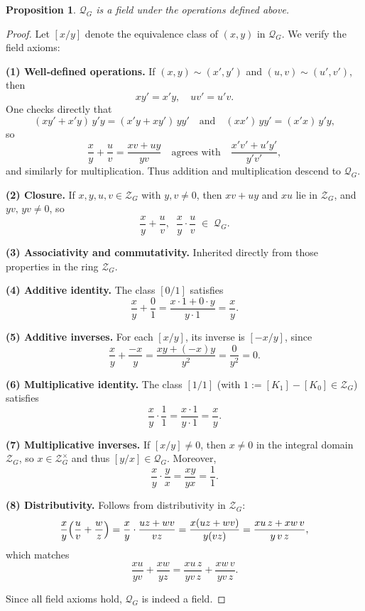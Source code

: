 \documentclass[11pt]{article}
\theoremstyle{definition}
\theoremstyle{plain}
\newtheorem{proposition}[definition]{Proposition}
\theoremstyle{remark}
\begin{document}
\begin{proposition}
$\mathcal{Q}_G$ is a field under the operations defined above.
\end{proposition}

\begin{proof}
Let $[x/y]$ denote the equivalence class of $(x,y)$ in $\mathcal{Q}_G$.  We verify the field axioms:

\medskip
\noindent\textbf{(1) Well‑defined operations.}
If $(x,y)\sim(x',y')$ and $(u,v)\sim(u',v')$, then
\[
xy'=x'y,\quad uv'=u'v.
\]
One checks directly that
\[
(xy'+x'y)\,y'y = (x'y+xy')\,yy' 
\quad\text{and}\quad
(xx')\,yy'=(x'x)\,y'y,
\]
so
\[
\frac{x}{y}+\frac{u}{v}
=\frac{xv+uy}{yv}
\quad\text{agrees with}\quad
\frac{x'v'+u'y'}{y'v'},
\]
and similarly for multiplication.  Thus addition and multiplication descend to $\mathcal{Q}_G$.

\medskip
\noindent\textbf{(2) Closure.}
If $x,y,u,v\in\mathcal{Z}_G$ with $y,v\neq0$, then $xv+uy$ and $x u$ lie in $\mathcal{Z}_G$, and $yv,\,yv\neq0$, so
\[
\frac{x}{y}+\frac{u}{v},\;\;
\frac{x}{y}\cdot\frac{u}{v}
\;\in\;\mathcal{Q}_G.
\]

\medskip
\noindent\textbf{(3) Associativity and commutativity.}
Inherited directly from those properties in the ring $\mathcal{Z}_G$.

\medskip
\noindent\textbf{(4) Additive identity.}
The class $[0/1]$ satisfies
\[
\frac{x}{y} + \frac{0}{1} = \frac{x\cdot1 + 0\cdot y}{y\cdot1} = \frac{x}{y}.
\]

\medskip
\noindent\textbf{(5) Additive inverses.}
For each $[x/y]$, its inverse is $[-x/y]$, since
\[
\frac{x}{y} + \frac{-x}{y} = \frac{xy + (-x)y}{y^2} = \frac{0}{y^2} = 0.
\]

\medskip
\noindent\textbf{(6) Multiplicative identity.}
The class $[1/1]$ (with $1 := [K_1]-[K_0]\in\mathcal{Z}_G$) satisfies
\[
\frac{x}{y}\cdot\frac{1}{1}
= \frac{x\cdot1}{y\cdot1}
= \frac{x}{y}.
\]

\medskip
\noindent\textbf{(7) Multiplicative inverses.}
If $[x/y]\neq0$, then $x\neq0$ in the integral domain $\mathcal{Z}_G$, so $x\in\mathcal{Z}_G^\times$ and thus $[y/x]\in\mathcal{Q}_G$.  Moreover,
\[
\frac{x}{y}\cdot\frac{y}{x}=\frac{xy}{yx}=\frac{1}{1}.
\]

\medskip
\noindent\textbf{(8) Distributivity.}
Follows from distributivity in $\mathcal{Z}_G$:
\[
\frac{x}{y}\Bigl(\frac{u}{v}+\frac{w}{z}\Bigr)
=\frac{x}{y}\cdot\frac{uz + wv}{vz}
=\frac{x(uz + wv)}{y(vz)}
=\frac{xu\,z + xw\,v}{y\,v\,z},
\]
which matches
\[
\frac{xu}{yv} + \frac{xw}{yz}
=\frac{x u\,z}{y v\,z} + \frac{x w\,v}{y v\,z}.
\]

Since all field axioms hold, $\mathcal{Q}_G$ is indeed a field.
\end{proof}
\end{document}
